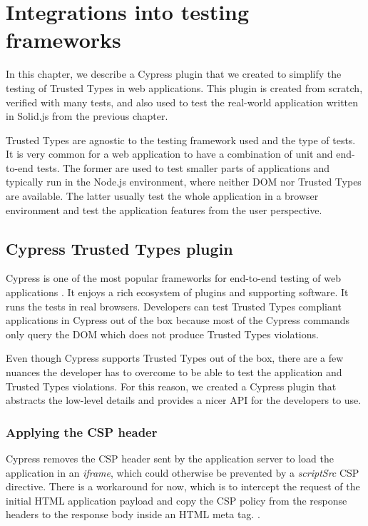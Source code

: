 \chapter{Integrations into testing frameworks}

In this chapter, we describe a Cypress plugin that we created to simplify the testing of Trusted
Types in web applications. This plugin is created from scratch, verified with many tests, and also
used to test the real-world application written in Solid.js from the previous chapter.

Trusted Types are agnostic to the testing framework used and the type of tests. It is very common
for a web application to have a combination of unit and end-to-end tests. The former are used to
test smaller parts of applications and typically run in the Node.js environment, where neither DOM
nor Trusted Types are available. The latter usually test the whole application in a browser
environment and test the application features from the user perspective.

\section{Cypress Trusted Types plugin}
\label{cypress_testing_plugin}

Cypress is one of the most popular frameworks for end-to-end testing of web applications
\cite{js_state:testing}. It enjoys a rich ecosystem of plugins and supporting software. It runs the
tests in real browsers. Developers can test Trusted Types compliant applications in Cypress out of
the box because most of the Cypress commands only query the DOM which does not produce Trusted Types
violations.

Even though Cypress supports Trusted Types out of the box, there are a few nuances the developer has
to overcome to be able to test the application and Trusted Types violations. For this reason, we
created a Cypress plugin that abstracts the low-level details and provides a nicer API for the
developers to use.

\subsection{Applying the CSP header}

Cypress removes the CSP header sent by the application server to load the application in an
\emph{iframe}, which could otherwise be prevented by a \emph{scriptSrc} CSP directive. There is a
workaround for now, which is to intercept the request of the initial HTML application payload and
copy the CSP policy from the response headers to the response body inside an HTML meta tag.
\cite{cypress:csp_removal_issue}.

